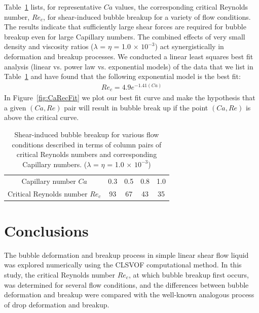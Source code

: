 \documentclass[%
 reprint,
 showkeys,
 amsmath,amssymb,
 aps,
 prfluids,
 onecolumn
]{revtex4-2}
\begin{document}
Table~\ref{tab:CaRecComparison} 
lists, for representative $Ca$ values,
the corresponding critical Reynolds number, $Re_{c}$, for shear-induced 
bubble breakup for a variety of flow
conditions.  The results indicate that sufficiently large shear forces are
required for bubble breakup even for large Capillary numbers. The combined
effects of very small density and viscosity ratios 
($\lambda$ = $\eta$ = 1.0 $\times$ $10^{-3}$) 
act synergistically in deformation and breakup processes.
We conducted a linear least squares best fit analysis (linear vs. 
power law vs. exponential models) of the data that we 
list in Table~\ref{tab:CaRecComparison} and have found that the following
exponential model is the best fit:
\begin{eqnarray}
Re_{c}=4.9 e^{-1.41 (Ca)} \label{bestfit}
\end{eqnarray}
In Figure~\ref{fig:CaRecFit} we plot our best fit curve and make the
hypothesis that a given $(Ca,Re)$ pair will result in bubble break up
if the point $(Ca,Re)$ is above the critical curve.

%
\begin{table}[tbh]
\caption{Shear-induced bubble breakup for various flow 
	conditions described in terms
        of column pairs of critical Reynolds numbers and 
	corresponding Capillary numbers.
        ($\lambda$ = $\eta$ = 1.0 $\times$ $10^{-3}$) 
	}
\label{tab:CaRecComparison}
\footnotesize
\center
\begin{tabular}{ c  c  c  c  c }
\hline
\hline
Capillary number $Ca$            & 0.3  & 0.5  & 0.8  & 1.0  \\
Critical Reynolds number $Re_c$  & 93   & 67   & 43   & 35   \\
\hline
\hline
\end{tabular}
\end{table}

\section{Conclusions}
The bubble deformation and breakup process in simple linear shear flow liquid
was explored numerically using the CLSVOF computational method.  In this study,
the critical Reynolds number $Re_{c}$, at which bubble breakup first occurs,
was determined for several flow conditions, and the differences between bubble
deformation and breakup were compared with the well-known analogous process of
drop deformation and breakup.
\end{document}
